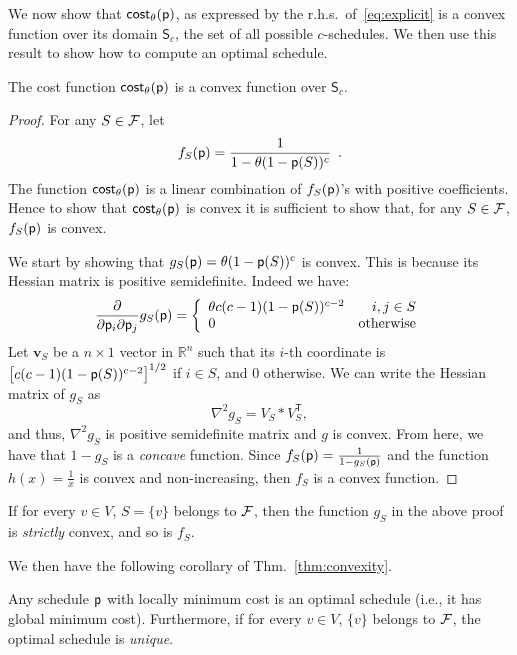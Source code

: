 We now show that $\mathsf{cost}_\theta(\mathsf{p})$, as expressed by the
r.h.s.~of~\eqref{eq:explicit} is a convex function over its domain
$\mathsf{S}_c$, the set of all possible $c$-schedules. We then use this result
to show how to compute an optimal schedule.

\begin{theorem}\label{thm:convexity}
	The cost function $\mathsf{cost}_\theta(\mathsf{p})$ is a convex function over
	$\mathsf{S}_c$.
\end{theorem}
\begin{proof}
	For any $S\in\mathcal{F}$, let
	\[
		f_S(\mathsf{p}) = \frac{1}{1 - \theta(1-\mathsf{p}(S))^c}\enspace.
	\]
	The function $\mathsf{cost}_\theta(\mathsf{p})$ is a linear combination of
	$f_S(\mathsf{p})$'s with positive coefficients. Hence to show that
	$\mathsf{cost}_\theta(\mathsf{p})$ is convex it is sufficient to show that, for any
	$S\in\mathcal{F}$, $f_S(\mathsf{p})$ is convex.

	We start by showing that $g_S(\mathsf{p}) = \theta(1-\mathsf{p}(S))^c$ is convex.
	This is because its Hessian matrix is positive semidefinite. Indeed we have:
	\[
		\frac{\partial}{\partial \mathsf{p}_i \partial \mathsf{p}_j} g_S(\mathsf{p})=\left\{
		\begin{array}{lr}
		\theta c(c-1) (1-\mathsf{p}(S))^{c-2} &  i,j \in S\\
		0 &  \text{otherwise}
		\end{array}
		\right.
	\]
	Let $\mathbf{v}_S$ be a $n\times 1$ vector in $\mathbb{R}^n$ such that its
	$i$-th coordinate is $\left[c(c-1) (1-\mathsf{p}(S))^{c-2} \right]^{1/2}$ if $i\in
	S$, and $0$ otherwise. We can write the Hessian matrix of $g_S$ as
	\[
		\nabla^2 g_S = V_S * V_S^\mathsf{T},
	\]
	and thus, $\nabla^2 g_S$ is positive semidefinite matrix and $g$ is convex.
	From here, we have that $1-g_S$ is a \emph{concave} function. Since
	$f_S(\mathsf{p})=\frac{1}{1-g_S(\mathsf{p})}$ and the function $h(x)=\frac{1}{x}$ is
	convex and non-increasing, then $f_S$ is a convex function.
\end{proof}

If for every $v\in V$, $S=\{v\}$ belongs to $\mathcal{F}$, then the
function $g_S$ in the above proof is \emph{strictly} convex, and so is $f_S$.

We then have the following corollary of Thm.~\ref{thm:convexity}.

\begin{corollary}\label{corol:convexity}
	Any schedule $\mathsf{p}$ with locally minimum cost is an optimal schedule
	(i.e., it has global minimum cost). Furthermore, if for every $v\in V$,
	$\{v\}$ belongs to $\mathcal{F}$, the optimal schedule is \emph{unique}.
\end{corollary}

